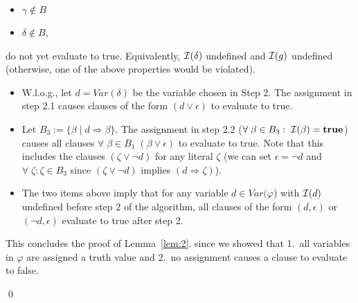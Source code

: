 \documentclass [11pt]{article}
\newcommand{\Ra}{\Rightarrow}
\renewcommand{\phi}{\varphi}
\def\II{{\cal I}}
\newcommand{\True}{\mathbf{true}}
\def\b{\beta}
\def\g{\gamma}
\def\d{\delta}
\def\e{\epsilon}
\def\z{\zeta}
\begin{document}
\begin{enumerate}
\begin{enumerate}[label=(\roman*), resume]
\begin{itemize}
\item $\g \not \in B$
\item $\d \not \in B$,
\end{itemize}
do not yet evaluate to true. Equivalently, $\II(\d)$ undefined and $\II(g)$ undefined (otherwise, one of the above properties would be violated). 
\begin{itemize}
\item W.l.o.g., let $d=Var(\d)$ be the variable chosen in Step 2. The assignment in step 2.1 causes clauses of the form $(d \lor \e)$ to evaluate to true. 
\item Let $B_3 := \{\b\; |\; d \Ra \b \}$. The assignment in step 2.2 ($\forall\; \b \in B_3:\;\II(\b) = \True$) causes all clauses $\forall\; \b \in B_1\;(\b \lor \e)$ to evaluate to true. Note that this includes the clauses $(\z \lor \neg d)$ for any literal $\z$ (we can set $\e = \neg d$ and $\forall\;\z: \z \in B_3$ since $(\z \lor \neg d)$ implies $(d \Ra \z)$).
\item The two items above imply that for any variable $d \in Var(\phi$) with $\II(d)$ undefined before step 2 of the algorithm, all clauses of the form $(d,\e)$ or $(\neg d, \e)$ evaluate to true after step 2. 
\end{itemize}
\end{enumerate}
\end{enumerate}

\noindent
This concludes the proof of Lemma~\ref{lem:2}. since we showed that 1.~all variables in $\phi$ are assigned a truth value and 2.~no assignment causes a clause to evaluate to false.

\qed
\end{document}
